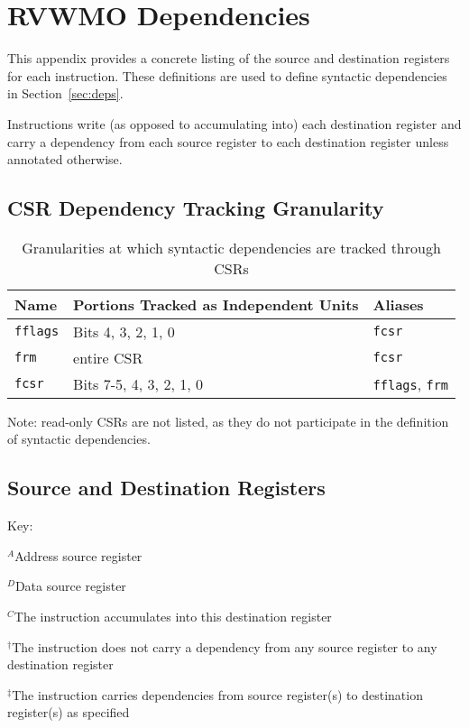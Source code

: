 \chapter{RVWMO Dependencies}
\label{ch:deps}
This appendix provides a concrete listing of the source and destination registers for each instruction.
These definitions are used to define syntactic dependencies in Section~\ref{sec:deps}.

Instructions write (as opposed to accumulating into) each destination register and carry a dependency from each source register to each destination register unless annotated otherwise.

\section{CSR Dependency Tracking Granularity}

\begin{table}[h!]
  \centering
  \begin{tabular}{|l|l|l|}
    \hline
    Name & Portions Tracked as Independent Units & Aliases \\
    \hline
    {\tt fflags} & Bits 4, 3, 2, 1, 0 & {\tt fcsr}  \\
    \hline
    {\tt frm} & entire CSR & {\tt fcsr} \\
    \hline
    {\tt fcsr} & Bits 7-5, 4, 3, 2, 1, 0 & {\tt fflags}, {\tt frm} \\
    \hline
  \end{tabular}
  \caption{Granularities at which syntactic dependencies are tracked through CSRs}
\end{table}

Note: read-only CSRs are not listed, as they do not participate in the definition of syntactic dependencies.

\section{Source and Destination Registers}

Key:

$^A$Address source register

$^D$Data source register

$^C$The instruction accumulates into this destination register

$^\dagger$The instruction does not carry a dependency from any source register to any destination register

$^\ddagger$The instruction carries dependencies from source register(s) to destination register(s) as specified

